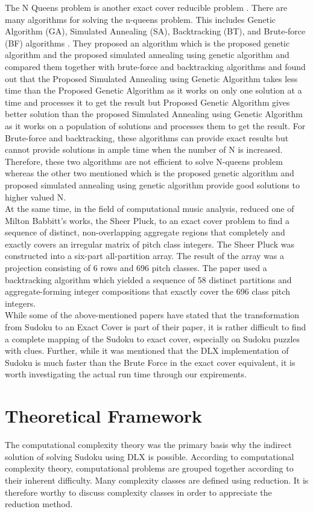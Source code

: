 \documentclass[a4paper,oneside,11pt]{report}
\begin{document}
	The N Queens problem is another exact cover reducible problem \cite{Knuth}. There are many algorithms for solving the n-queens problem. This includes Genetic Algorithm (GA), Simulated Annealing (SA), Backtracking (BT), and Brute-force (BF) algorithms \cite{Mukherjee}. They proposed an algorithm which is the proposed genetic algorithm and the proposed simulated annealing using genetic algorithm and compared them together with brute-force and backtracking algorithms and found out that the Proposed Simulated Annealing using Genetic Algorithm takes less time than the Proposed Genetic Algorithm as it works on only one solution at a time and processes it to get the result but Proposed Genetic Algorithm gives better solution than the proposed Simulated Annealing using Genetic Algorithm as it works on a population of solutions and processes them to get the result. For Brute-force and backtracking, these algorithms can provide exact results but cannot provide solutions in ample time when the number of N is increased. Therefore, these two algorithms are not efficient to solve N-queens problem whereas the other two mentioned which is the proposed genetic algorithm and proposed simulated annealing using genetic algorithm provide good solutions to higher valued N.\\
	
	At the same time, in the field of computational music analysis, \cite{Bemman} reduced one of Milton Babbitt’s works, the Sheer Pluck, to an exact cover problem to find a sequence of distinct, non-overlapping aggregate regions that completely and exactly covers an irregular matrix of pitch class integers. The Sheer Pluck was constructed into a six-part all-partition array. The result of the array was a projection consisting of 6 rows and 696 pitch classes. The paper used a backtracking algorithm which yielded a sequence of 58 distinct partitions and aggregate-forming integer compositions that exactly cover the 696 class pitch integers.\\
	
While some of the above-mentioned papers have stated that the transformation from Sudoku to an Exact Cover is part of their paper, it is rather difficult to find a complete mapping of the Sudoku to exact cover, especially on Sudoku puzzles with clues. Further, while it was mentioned that the DLX implementation of Sudoku is much faster than the Brute Force in the exact cover equivalent, it is worth investigating the actual run time through our expirements.

\chapter{Theoretical Framework}
The computational complexity theory was the primary basis why the indirect solution of solving Sudoku using DLX is possible. According to computational complexity theory, computational problems are grouped together according to their inherent difficulty. Many complexity classes are defined using reduction. It is therefore worthy to discuss complexity classes in order to appreciate the reduction method.\\
\end{document}
